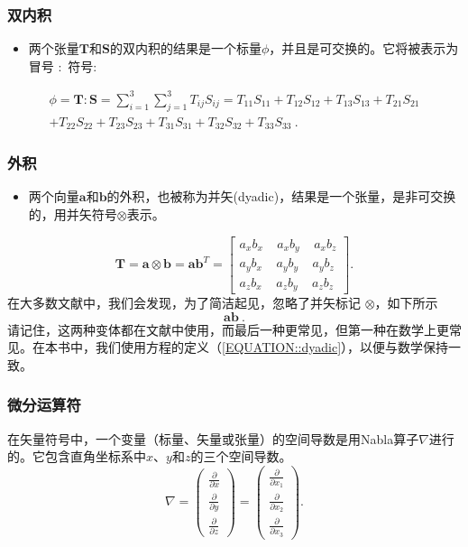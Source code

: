 \documentclass[MathematicsNumericsDerivationsAndOpenFOAM.tex]{subfiles}
\begin{document}
\subsubsection{双内积}
%
%
\begin{itemize}
   \item 两个张量$\textbf{T}$和$\textbf{S}$的双内积的结果是一个标量$\phi$，并且是可交换的。它将被表示为冒号 $\boldsymbol \colon$ 符号:
\end{itemize}
%
%
\begin{multline}
 \phi = \textbf{T} \boldsymbol \colon \textbf{S} = \sum_{i=1}^{3}\sum_{j=1}^{3} T_{ij} S_{ij}
=
 T_{11} S_{11} + T_{12} S_{12} + T_{13} S_{13} + T_{21} S_{21} \\
+
 T_{22} S_{22} +
 T_{23} S_{23} + T_{31} S_{31} + T_{32} S_{32} + T_{33} S_{33} ~.
\label{EQUATION::doubleInnerProduct}
\end{multline}
%
%
%
%
\subsubsection{外积}
%
%
\begin{itemize}
    \item 两个向量$\textbf{a}$和$\textbf{b}$的外积，也被称为并矢(dyadic)，结果是一个张量，是非可交换的，用并矢符号$\otimes$表示。
\end{itemize}
%
%
%
\begin{equation}
  \textbf{T} = \textbf{a} \otimes \textbf{b} = \textbf{a} \textbf{b}^T =   \left[
  \begin{matrix}
   a_xb_x ~ ~ ~ ~ ~ a_xb_y ~ ~ ~ ~ ~ a_xb_z \\
   a_yb_x ~ ~ ~ ~ ~ a_yb_y ~ ~ ~ ~ ~ a_yb_z \\
   a_zb_x ~ ~ ~ ~ ~ a_zb_y ~ ~ ~ ~ ~ a_zb_z
  \end{matrix}
  \right].
   \label{EQUATION::dyadic}
\end{equation}
%
%
	在大多数文献中，我们会发现，为了简洁起见，忽略了并矢标记 $\otimes$，如下所示
%
%
\begin{equation}
  \textbf{a}\textbf{b}~.
  \label{EQUATION::outerProduct}
\end{equation}
%
%
	请记住，这两种变体都在文献中使用，而最后一种更常见，但第一种在数学上更常见。在本书中，我们使用方程的定义（\ref{EQUATION::dyadic}），以便与数学保持一致。
%
%
%
%
\subsubsection{微分运算符}
%
%
	在矢量符号中，一个变量（标量、矢量或张量）的空间导数是用Nabla算子$\nabla$进行的。它包含直角坐标系中$x$、$y$和$z$的三个空间导数。
%
%
$$
  \nabla
=
  \left(
  \begin{matrix}
    \frac{\partial}{\partial x} \\
    \frac{\partial}{\partial y} \\
    \frac{\partial}{\partial z}
  \end{matrix}
  \right)
=
  \left(
  \begin{matrix}
    \frac{\partial}{\partial x_1} \\
    \frac{\partial}{\partial x_2} \\
    \frac{\partial}{\partial x_3}
  \end{matrix}
  \right) .
$$
%
%
%
%
\end{document}
